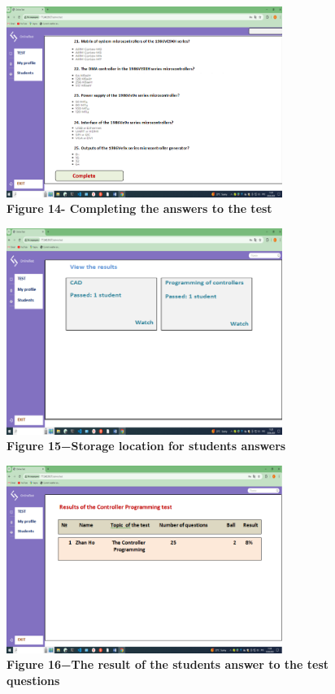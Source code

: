\begin{figure}[H]
	\centering
	\includegraphics[height=0.35\textwidth, width=0.8\textwidth]{assets/139}
	\caption*{\bfseries Figure 14- Completing the answers to the test}
\end{figure}



\begin{figure}[H]
	\centering
	\includegraphics[height=0.35\textwidth, width=0.8\textwidth]{assets/140}
	\caption*{\bfseries Figure 15−Storage location for students\textquotesingle{}
	answers}
\end{figure}



\begin{figure}[H]
	\centering
	\includegraphics[height=0.35\textwidth, width=0.8\textwidth]{assets/141}
	\caption*{\bfseries Figure 16−The result of the student\textquotesingle s answer to
	the test questions}
\end{figure}

